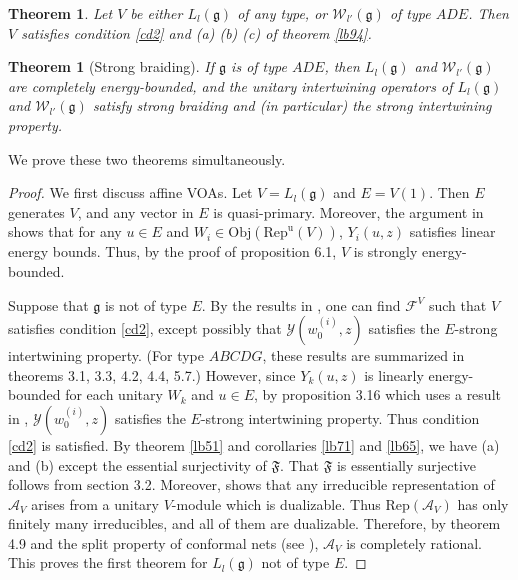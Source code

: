 \documentclass[11pt,b5paper,notitlepage]{article}
\theoremstyle{definition}
\theoremstyle{plain}
\newtheorem{thm}[df]{Theorem}
\newcommand{\fk}{\mathfrak}
\newcommand{\mc}{\mathcal}
\newcommand{\Rep}{\mathrm{Rep}}
\newcommand{\gk}{\mathfrak g}
\newcommand{\RepuV}{\mathrm{Rep}^{\mathrm u}(V)}
\newcommand{\Obj}{\mathrm{Obj}}
\numberwithin{equation}{subsection}
\begin{document}
\begin{thm}\label{lb81}
Let $V$ be either $L_l(\gk)$  of any type, or $\mc W_{l'}(\gk)$ of type $ADE$. Then $V$ satisfies condition \ref{cd2} and (a) (b) (c) of theorem \ref{lb94}.
\end{thm}


\begin{thm}[Strong braiding]\label{lb82}
If $\gk$ is of type $ADE$, then $L_l(\gk)$ and $\mc W_{l'}(\gk)$ are completely energy-bounded, and the unitary intertwining operators of $L_l(\gk)$ and $\mc W_{l'}(\gk)$ satisfy  strong braiding and (in particular) the strong intertwining property. 
\end{thm}

We prove these two theorems simultaneously.


\begin{proof}
We first discuss affine VOAs. Let $V=L_l(\gk)$ and $E=V(1)$. Then $E$ generates $V$, and any vector in $E$ is quasi-primary. Moreover, the argument in \cite{BS90} shows that for any $u\in E$ and $W_i\in\Obj(\RepuV)$, $Y_i(u,z)$ satisfies linear energy bounds. Thus, by the proof of \cite{CKLW18} proposition 6.1, $V$ is strongly energy-bounded.



Suppose that $\gk$ is not of type $E$. By the results in \cite{Was98,TL04,Gui19c,Gui20b},  one can find $\mc F^V$ such that $V$  satisfies  condition \ref{cd2}, except possibly that $\mc Y(w^{(i)}_0,z)$ satisfies the $E$-strong intertwining property.  (For type $ABCDG$, these results are summarized in \cite{Gui19c} theorems 3.1, 3.3, 4.2, 4.4, 5.7.) However, since $Y_k(u,z)$ is linearly energy-bounded for each unitary $W_k$ and $u\in E$, by \cite{Gui19a} proposition 3.16 which uses a result in \cite{TL99}, $\mc Y(w^{(i)}_0,z)$ satisfies the $E$-strong intertwining property. Thus condition \ref{cd2} is satisfied. By theorem \ref{lb51} and corollaries \ref{lb71} and \ref{lb65}, we have (a) and (b)  except the essential surjectivity of $\fk F$. That $\fk F$ is essentially surjective follows from \cite{Hen19} section 3.2. Moreover, \cite{Hen19} shows that any irreducible representation of $\mc A_V$ arises from a unitary $V$-module which is dualizable. Thus $\Rep(\mc A_V)$ has only finitely many irreducibles, and all of them are dualizable. Therefore, by \cite{LX04} theorem 4.9 and the split property of conformal nets (see \cite{MTW18}), $\mc A_V$ is completely rational. This proves the first theorem for $L_l(\gk)$ not of type $E$.



\end{proof}
\end{document}
